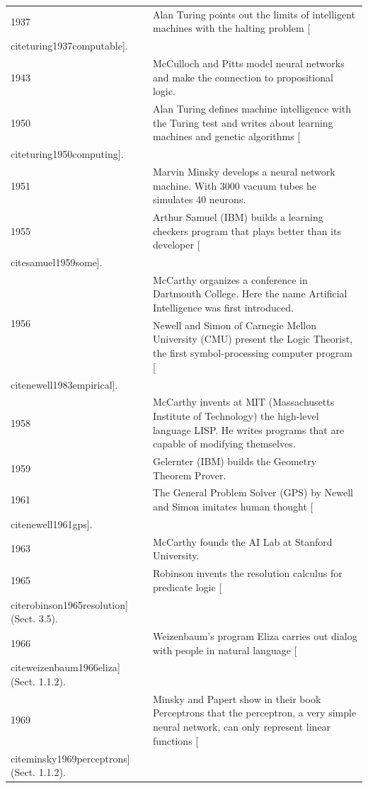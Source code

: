 \documentclass[10pt]{book}
\begin{document}
\begin{table}[htbp]
\begin{center}
\begin{tabular}{|l|l|}
\hline
1937 & Alan Turing points out the limits of intelligent machines with the halting problem [\\cite{turing1937computable}]. \\
\hline
1943 & McCulloch and Pitts model neural networks and make the connection to propositional logic. \\
\hline
1950 & Alan Turing defines machine intelligence with the Turing test and writes about learning machines and genetic algorithms [\\cite{turing1950computing}]. \\
\hline
1951 & Marvin Minsky develops a neural network machine. With 3000 vacuum tubes he simulates 40 neurons. \\
\hline
1955 & Arthur Samuel (IBM) builds a learning checkers program that plays better than its developer [\\cite{samuel1959some}]. \\
\hline
\multirow[t]{2}{*}{1956} & McCarthy organizes a conference in Dartmouth College. Here the name Artificial Intelligence was first introduced. \\
\hline
 & Newell and Simon of Carnegie Mellon University (CMU) present the Logic Theorist, the first symbol-processing computer program [\\cite{newell1983empirical}]. \\
\hline
1958 & McCarthy invents at MIT (Massachusetts Institute of Technology) the high-level language LISP. He writes programs that are capable of modifying themselves. \\
\hline
1959 & Gelernter (IBM) builds the Geometry Theorem Prover. \\
\hline
1961 & The General Problem Solver (GPS) by Newell and Simon imitates human thought [\\cite{newell1961gps}]. \\
\hline
1963 & McCarthy founds the AI Lab at Stanford University. \\
\hline
1965 & Robinson invents the resolution calculus for predicate logic [\\cite{robinson1965resolution}] (Sect. 3.5). \\
\hline
1966 & Weizenbaum's program Eliza carries out dialog with people in natural language [\\cite{weizenbaum1966eliza}] (Sect. 1.1.2). \\
\hline
1969 & Minsky and Papert show in their book Perceptrons that the perceptron, a very simple neural network, can only represent linear functions [\\cite{minsky1969perceptrons}] (Sect. 1.1.2). \\

\end{tabular}
\end{center}
\end{table}
\end{document}
